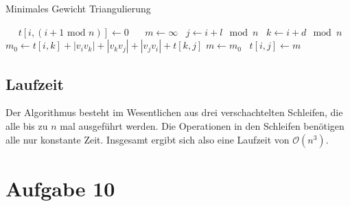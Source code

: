 \begin{algorithm}
	\caption{Minimales Gewicht Triangulierung}

	\begin{algorithmic}[1]
				 
			\EndIf{}
			\Statex\
			  
				\State\ $t[i, (i + 1 \text{ mod } n)] \gets 0$
			\EndFor{}
			\Statex\
			 
				\For{$i \gets 0 \ato \begin{cases}
					\textbf{if } l \neq n - 1 \text{:} & n - 1 \\
					\textbf{else}\text{:} & 0
				\end{cases}$} 
					\State\ $m \gets \infty$
					\State\ $j \gets i + l \mod n$
					 
						\State\ $k \gets i + d \mod n$
						\State\ $m_0 \gets t[i, k] + |v_i v_k| + |v_k v_j| + |v_j v_i| + t[k, j]$
							$m \gets m_0$
						\EndIf{}
					\EndFor{}
					\State\ $t[i, j] \gets m$
				\EndFor{}
			\EndFor{}
			\Statex\
			\State\ 
		\EndFunction{}
	\end{algorithmic}
\end{algorithm}

\subsection{Laufzeit}
\label{sub:Laufzeit}

Der Algorithmus besteht im Wesentlichen aus drei verschachtelten Schleifen, die alle bis zu $n$ mal ausgeführt werden. Die Operationen in den Schleifen benötigen alle nur konstante Zeit. Insgesamt ergibt sich also eine Laufzeit von $\mathcal{O}(n^3)$.

\section*{Aufgabe 10}
\label{sec:Aufgabe 10}



